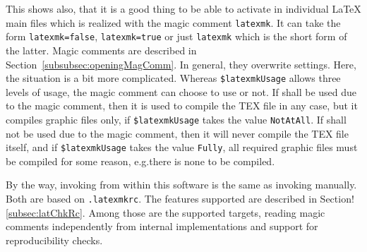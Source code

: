 This shows also, that it is a good thing 
to be able to activate  in individual \LaTeX{} main files 
which is realized with the magic comment \texttt{latexmk}. 
It can take the form \texttt{latexmk=false}, \texttt{latexmk=true} or just \texttt{latexmk} 
which is the short form of the latter. 
Magic comments are described in Section~\ref{subsubsec:openingMagComm}. 
In general, they overwrite settings. 
Here, the situation is a bit more complicated. 
Whereas \texttt{\$latexmkUsage} allows three levels of usage, 
the magic comment can choose to use  or not. 
If  shall be used due to the magic comment, 
then it is used to compile the TEX file in any case, 
but it compiles graphic files only, if \texttt{\$latexmkUsage} takes the value \texttt{NotAtAll}. 
If  shall not be used due to the magic comment, 
then it will never compile the TEX file itself, 
and if \texttt{\$latexmkUsage} takes the value \texttt{Fully}, 
all required graphic files must be compiled for some reason, 
e.g.\@ there is none to be compiled. 
\medskip






By the way, invoking  from within this software is the same as invoking manually. 
Both are based on \texttt{.latexmkrc}. 
The features supported are described in Section!\ref{subsec:latChkRc}. 
Among those are the supported targets, 
reading magic comments independently from internal implementations 
and support for reproducibility checks. 






